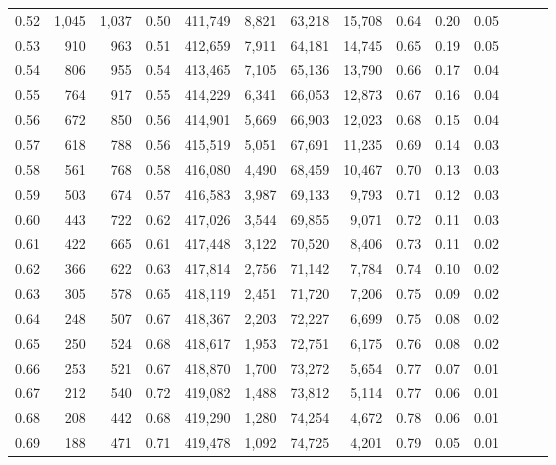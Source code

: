 \begin{tabular}{rrrrrrrrrrrrrr}
0.52 &   1,045 &  1,037 &  0.50 &  411,749 &    8,821 &  63,218 &  15,708 &  0.64 &  0.20 &      0.05 \\
0.53 &     910 &    963 &  0.51 &  412,659 &    7,911 &  64,181 &  14,745 &  0.65 &  0.19 &      0.05 \\
0.54 &     806 &    955 &  0.54 &  413,465 &    7,105 &  65,136 &  13,790 &  0.66 &  0.17 &      0.04 \\
0.55 &     764 &    917 &  0.55 &  414,229 &    6,341 &  66,053 &  12,873 &  0.67 &  0.16 &      0.04 \\
0.56 &     672 &    850 &  0.56 &  414,901 &    5,669 &  66,903 &  12,023 &  0.68 &  0.15 &      0.04 \\
0.57 &     618 &    788 &  0.56 &  415,519 &    5,051 &  67,691 &  11,235 &  0.69 &  0.14 &      0.03 \\
0.58 &     561 &    768 &  0.58 &  416,080 &    4,490 &  68,459 &  10,467 &  0.70 &  0.13 &      0.03 \\
0.59 &     503 &    674 &  0.57 &  416,583 &    3,987 &  69,133 &   9,793 &  0.71 &  0.12 &      0.03 \\
0.60 &     443 &    722 &  0.62 &  417,026 &    3,544 &  69,855 &   9,071 &  0.72 &  0.11 &      0.03 \\
0.61 &     422 &    665 &  0.61 &  417,448 &    3,122 &  70,520 &   8,406 &  0.73 &  0.11 &      0.02 \\
0.62 &     366 &    622 &  0.63 &  417,814 &    2,756 &  71,142 &   7,784 &  0.74 &  0.10 &      0.02 \\
0.63 &     305 &    578 &  0.65 &  418,119 &    2,451 &  71,720 &   7,206 &  0.75 &  0.09 &      0.02 \\
0.64 &     248 &    507 &  0.67 &  418,367 &    2,203 &  72,227 &   6,699 &  0.75 &  0.08 &      0.02 \\
0.65 &     250 &    524 &  0.68 &  418,617 &    1,953 &  72,751 &   6,175 &  0.76 &  0.08 &      0.02 \\
0.66 &     253 &    521 &  0.67 &  418,870 &    1,700 &  73,272 &   5,654 &  0.77 &  0.07 &      0.01 \\
0.67 &     212 &    540 &  0.72 &  419,082 &    1,488 &  73,812 &   5,114 &  0.77 &  0.06 &      0.01 \\
0.68 &     208 &    442 &  0.68 &  419,290 &    1,280 &  74,254 &   4,672 &  0.78 &  0.06 &      0.01 \\
0.69 &     188 &    471 &  0.71 &  419,478 &    1,092 &  74,725 &   4,201 &  0.79 &  0.05 &      0.01 \\

\end{tabular}
